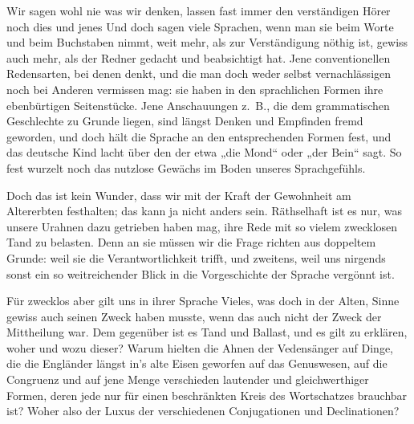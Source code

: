Wir sagen wohl nie  was wir denken, lassen fast immer den \label{fp.343} verständigen Hörer noch dies und jenes  Und doch sagen viele Sprachen, wenn man sie beim Worte und beim Buchstaben nimmt, weit mehr, als zur Verständigung nöthig ist, gewiss auch mehr, als der Redner gedacht und beabsichtigt hat. Jene conventionellen Redensarten, bei denen  denkt, und die man doch weder selbst vernachlässigen noch bei Anderen vermissen mag: sie haben in den sprachlichen Formen ihre ebenbürtigen Seitenstücke. Jene Anschauungen z.~B., die dem grammatischen Geschlechte zu Grunde liegen, sind längst  Denken und Empfinden fremd geworden, und doch hält die Sprache an den entsprechenden Formen fest, und das deutsche Kind lacht über den  der etwa „die Mond“ oder „der Bein“ sagt. So fest wurzelt noch das nutzlose Gewächs im Boden unseres Sprachgefühls.

Doch das ist kein Wunder, dass wir mit der Kraft der Gewohnheit am Altererbten festhalten; das kann ja nicht anders sein. Räthselhaft ist es nur, was unsere Urahnen dazu getrieben haben mag, ihre Rede mit so vielem zweck\label{sp.361}losen Tand zu belasten. Denn an sie müssen wir die Frage richten aus doppeltem Grunde:  weil sie die Verantwortlichkeit trifft, und zweitens, weil uns nirgends sonst ein so weitreichender Blick in die Vorgeschichte der Sprache vergönnt ist.

Für zwecklos aber gilt uns in ihrer Sprache Vieles, was doch in  der Alten, Sinne gewiss auch seinen Zweck haben musste, wenn das auch nicht der Zweck der Mittheilung war. \label{fp.212} Dem gegenüber ist es Tand und Ballast, und es gilt zu erklären, woher und wozu dieser? Warum hielten die Ahnen der Vedensänger auf Dinge, die die Engländer längst in’s alte Eisen geworfen  auf das Genuswesen, auf die Congruenz und auf jene Menge verschieden lautender und gleichwerthiger Formen, deren jede nur für einen beschränkten Kreis des Wortschatzes brauchbar ist? Woher also der Luxus der verschiedenen Conjugationen und Declinationen?

